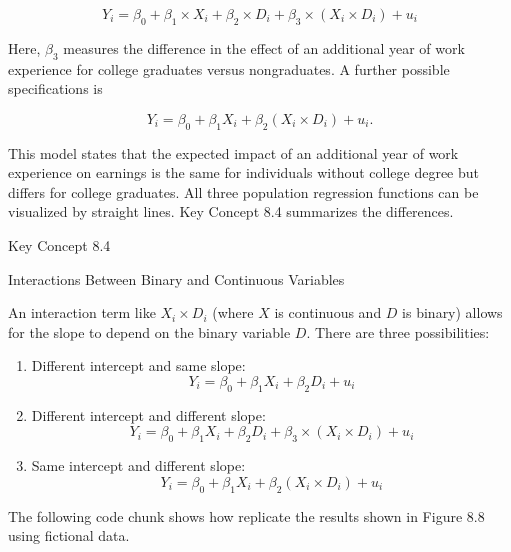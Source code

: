 \documentclass[]{book}
\theoremstyle{definition}
\theoremstyle{definition}
\theoremstyle{definition}
\theoremstyle{remark}
\begin{document}
\[ Y_i = \beta_0 + \beta_1 \times X_i + \beta_2 \times D_i + \beta_3 \times (X_i \times D_i) + u_i  \]

Here, \(\beta_3\) measures the difference in the effect of an additional
year of work experience for college graduates versus nongraduates. A
further possible specifications is

\[ Y_i = \beta_0 + \beta_1 X_i + \beta_2 (X_i \times D_i) + u_i. \]

This model states that the expected impact of an additional year of work
experience on earnings is the same for individuals without college
degree but differs for college graduates. All three population
regression functions can be visualized by straight lines. Key Concept
8.4 summarizes the differences.

Key Concept 8.4

Interactions Between Binary and Continuous Variables

An interaction term like \(X_i \times D_i\) (where \(X\) is continuous
and \(D\) is binary) allows for the slope to depend on the binary
variable \(D\). There are three possibilities:

\begin{enumerate}
\def\labelenumi{\arabic{enumi}.}
\item
  Different intercept and same slope:
  \[ Y_i = \beta_0 + \beta_1 X_i + \beta_2 D_i + u_i \]
\item
  Different intercept and different slope:
  \[ Y_i = \beta_0 + \beta_1 X_i + \beta_2 D_i + \beta_3 \times (X_i \times D_i) + u_i \]
\item
  Same intercept and different slope:
  \[ Y_i = \beta_0 + \beta_1 X_i + \beta_2 (X_i \times D_i) + u_i \]
\end{enumerate}

The following code chunk shows how replicate the results shown in Figure
8.8 using fictional data.
\end{document}

